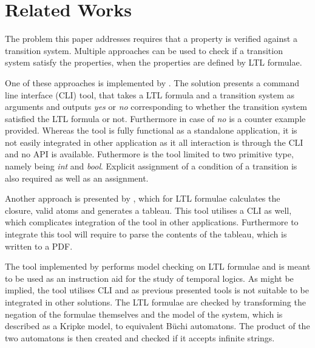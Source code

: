 \section{Related Works}
The problem this paper addresses requires that a property is verified against a transition system. Multiple approaches can be used to check if a transition system satisfy the properties, when the properties are defined by LTL formulae.

One of these approaches is implemented by \cite{serejke}. The solution presents a command line interface (CLI) tool, that takes a LTL formula and a transition system as arguments and outputs \textit{yes} or \textit{no} corresponding to whether the transition system satisfied the LTL formula or not. Furthermore in case of \textit{no} is a counter example provided. Whereas the tool is fully functional as a standalone application, it is not easily integrated in other application as it all interaction is through the CLI and no API is available. Futhermore is the tool limited to two primitive type, namely being \textit{int} and \textit{bool}. Explicit assignment of a condition of a transition is also required as well as an assignment.

Another approach is presented by \cite{erlkoenig90}, which for LTL formulae calculates the closure, valid atoms and generates a tableau. This tool utilises a CLI as well, which complicates integration of the tool in other applications. Furthermore to integrate this tool will require to parse the contents of the tableau, which is written to a PDF.

The tool implemented by \cite{jpsember} performs model checking on LTL formulae and is meant to be used as an instruction aid for the study of temporal logics. As might be implied, the tool utilises CLI and as previous presented tools is not suitable to be integrated in other solutions. The LTL formulae are checked by transforming the negation of the formulae themselves and the model of the system, which is described as a Kripke model, to equivalent Büchi automatons. The product of the two automatons is then created and checked if it accepts infinite strings.